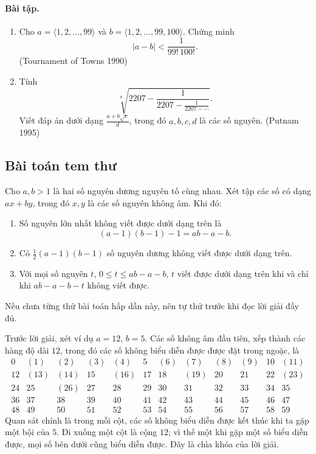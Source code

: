 \documentclass[11pt]{article}
\begin{document}
\paragraph{Bài tập.}
\begin{enumerate}
\item Cho \(a=\langle1,2,\ldots,99\rangle\) và
\(b=\langle1,2,\ldots,99,100\rangle\). Chứng minh
\[
 |a-b|<\frac1{99!\,100!}.
\]
(Tournament of Towns 1990)
\item Tính
\[
 \sqrt[8]{2207-\frac1{2207-\frac1{2207-\cdots}}}.
\]
Viết đáp án dưới dạng \(\frac{a+b\sqrt c}{d}\), trong đó \(a,b,c,d\) là các
số nguyên. (Putnam 1995)
\end{enumerate}

\subsection{Bài toán tem thư}

Cho \(a,b>1\) là hai số nguyên dương nguyên tố cùng nhau. Xét tập các số có
dạng \(ax+by\), trong đó \(x,y\) là các số nguyên không âm. Khi đó:
\begin{enumerate}
\item Số nguyên lớn nhất không viết được dưới dạng trên là
\[
 (a-1)(b-1)-1=ab-a-b.
\]
\item Có \(\frac12(a-1)(b-1)\) số nguyên dương không viết được dưới dạng trên.
\item Với mọi số nguyên \(t\), \(0\le t\le ab-a-b\), \(t\) viết được dưới dạng
trên khi và chỉ khi \(ab-a-b-t\) không viết được.
\end{enumerate}
Nếu chưa từng thử bài toán hấp dẫn này, nên tự thử trước khi đọc lời giải đầy
đủ.

Trước lời giải, xét ví dụ \(a=12\), \(b=5\). Các số không âm đầu tiên, xếp
thành các hàng độ dài \(12\), trong đó các số không biểu diễn được được đặt
trong ngoặc, là
\[
\begin{array}{rrrrrrrrrrrr}
0&(1)&(2)&(3)&(4)&5&(6)&(7)&(8)&(9)&10&(11)\\
12&(13)&(14)&15&(16)&17&18&(19)&20&21&22&(23)\\
24&25&(26)&27&28&29&30&31&32&33&34&35\\
36&37&38&39&40&41&42&43&44&45&46&47\\
48&49&50&51&52&53&54&55&56&57&58&59
\end{array}
\]
Quan sát chính là trong mỗi cột, các số không biểu diễn được kết thúc khi ta
gặp một bội của \(5\). Đi xuống một cột là cộng \(12\); vì thế một khi gặp một
số biểu diễn được, mọi số bên dưới cũng biểu diễn được. Đây là chìa khóa của
lời giải.
\end{document}
